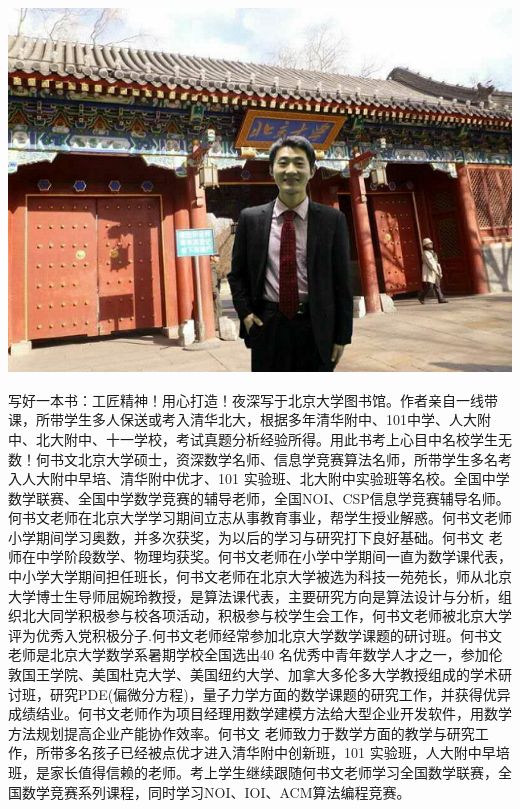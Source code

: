 \documentclass[12pt,twiside,a4paper]{ctexbook}
\numberwithin{chapter}{part}
\begin{document}

\author
{
Peking University\\
北京大学\\
ShuwenHe\\
何书文\\
1201220707@pku.edu.cn
}

\centerline{\includegraphics{shuwenhe.png}}
写好一本书：工匠精神！用心打造！夜深写于北京大学图书馆。作者亲自一线带课，所带学生多人保送或考入清华北大，根据多年清华附中、101中学、人大附中、北大附中、十一学校，考试真题分析经验所得。用此书考上心目中名校学生无数！何书文北京大学硕士，资深数学名师、信息学竞赛算法名师，所带学生多名考入人大附中早培、清华附中优才、101 实验班、北大附中实验班等名校。全国中学数学联赛、全国中学数学竞赛的辅导老师，全国NOI、CSP信息学竞赛辅导名师。何书文老师在北京大学学习期间立志从事教育事业，帮学生授业解惑。何书文老师小学期间学习奥数，并多次获奖，为以后的学习与研究打下良好基础。何书文 老师在中学阶段数学、物理均获奖。何书文老师在小学中学期间一直为数学课代表，中小学大学期间担任班长，何书文老师在北京大学被选为科技一苑苑长，师从北京大学博士生导师屈婉玲教授，是算法课代表，主要研究方向是算法设计与分析，组织北大同学积极参与校各项活动，积极参与校学生会工作，何书文老师被北京大学评为优秀入党积极分子.何书文老师经常参加北京大学数学课题的研讨班。何书文 老师是北京大学数学系暑期学校全国选出40 名优秀中青年数学人才之一，参加伦敦国王学院、美国杜克大学、美国纽约大学、加拿大多伦多大学教授组成的学术研讨班，研究PDE(偏微分方程)，量子力学方面的数学课题的研究工作，并获得优异成绩结业。何书文老师作为项目经理用数学建模方法给大型企业开发软件，用数学方法规划提高企业产能协作效率。何书文 老师致力于数学方面的教学与研究工作，所带多名孩子已经被点优才进入清华附中创新班，101 实验班，人大附中早培班，是家长值得信赖的老师。考上学生继续跟随何书文老师学习全国数学联赛，全国数学竞赛系列课程，同时学习NOI、IOI、ACM算法编程竞赛。
\end{document}
